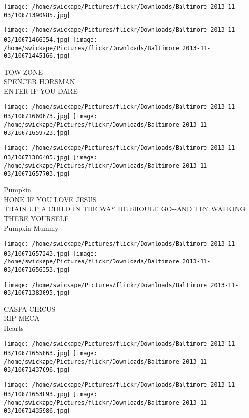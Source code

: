 \documentclass[10pt,letterpaper]{article}
\begin{document}
\texttt{[image: /home/swickape/Pictures/flickr/Downloads/Baltimore 2013-11-03/10671390985.jpg]}

\vspace{0.25in}
\texttt{[image: /home/swickape/Pictures/flickr/Downloads/Baltimore 2013-11-03/10671466354.jpg]}
\texttt{[image: /home/swickape/Pictures/flickr/Downloads/Baltimore 2013-11-03/10671445166.jpg]}

TOW ZONE\\
SPENCER HORSMAN\\
ENTER IF YOU DARE\\
\pagebreak

\texttt{[image: /home/swickape/Pictures/flickr/Downloads/Baltimore 2013-11-03/10671660673.jpg]}
\texttt{[image: /home/swickape/Pictures/flickr/Downloads/Baltimore 2013-11-03/10671659723.jpg]}

\texttt{[image: /home/swickape/Pictures/flickr/Downloads/Baltimore 2013-11-03/10671386405.jpg]}
\texttt{[image: /home/swickape/Pictures/flickr/Downloads/Baltimore 2013-11-03/10671657703.jpg]}

Pumpkin\\
HONK IF YOU LOVE JESUS\\
TRAIN UP A CHILD IN THE WAY HE SHOULD GO{-}{-}AND TRY WALKING THERE YOURSELF\\
Pumpkin Mummy\\
\pagebreak

\texttt{[image: /home/swickape/Pictures/flickr/Downloads/Baltimore 2013-11-03/10671657243.jpg]}
\texttt{[image: /home/swickape/Pictures/flickr/Downloads/Baltimore 2013-11-03/10671656353.jpg]}

\vspace{0.25in}
\texttt{[image: /home/swickape/Pictures/flickr/Downloads/Baltimore 2013-11-03/10671383095.jpg]}

CASPA CIRCUS\\
RIP MECA\\
Hearts\\
\pagebreak

\texttt{[image: /home/swickape/Pictures/flickr/Downloads/Baltimore 2013-11-03/10671655063.jpg]}
\texttt{[image: /home/swickape/Pictures/flickr/Downloads/Baltimore 2013-11-03/10671437696.jpg]}

\texttt{[image: /home/swickape/Pictures/flickr/Downloads/Baltimore 2013-11-03/10671653893.jpg]}
\texttt{[image: /home/swickape/Pictures/flickr/Downloads/Baltimore 2013-11-03/10671435986.jpg]}
\end{document}

